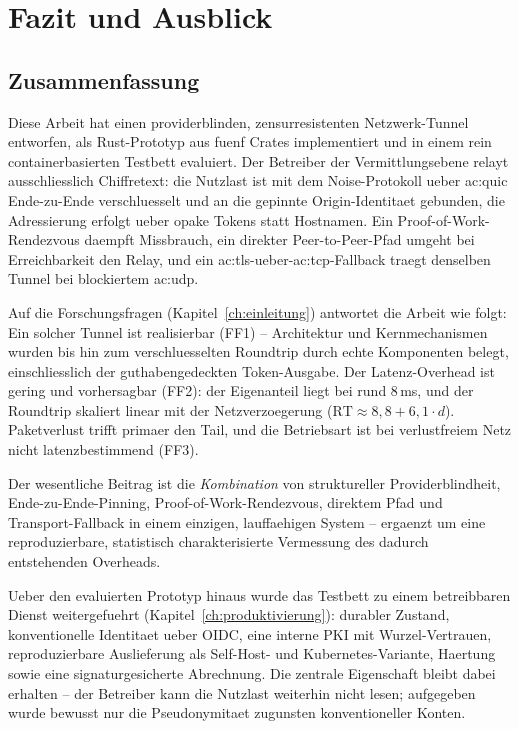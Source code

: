 \chapter{Fazit und Ausblick}
\label{ch:fazit}

\section{Zusammenfassung}
\label{sec:fazit-zusammenfassung}

Diese Arbeit hat einen providerblinden, zensurresistenten Netzwerk-Tunnel
entworfen, als Rust-Prototyp aus fuenf Crates implementiert und in einem rein
containerbasierten Testbett evaluiert. Der Betreiber der Vermittlungsebene relayt
ausschliesslich Chiffretext: die Nutzlast ist mit dem Noise-Protokoll ueber
\gls{ac:quic} Ende-zu-Ende verschluesselt und an die gepinnte Origin-Identitaet
gebunden, die Adressierung erfolgt ueber opake Tokens statt Hostnamen. Ein
Proof-of-Work-Rendezvous daempft Missbrauch, ein direkter Peer-to-Peer-Pfad
umgeht bei Erreichbarkeit den Relay, und ein
\gls{ac:tls}-ueber-\gls{ac:tcp}-Fallback traegt denselben Tunnel bei blockiertem
\gls{ac:udp}.

Auf die Forschungsfragen (Kapitel~\ref{ch:einleitung}) antwortet die Arbeit wie
folgt: Ein solcher Tunnel ist realisierbar (FF1) -- Architektur und
Kernmechanismen wurden bis hin zum verschluesselten Roundtrip durch echte
Komponenten belegt, einschliesslich der guthabengedeckten Token-Ausgabe. Der
Latenz-Overhead ist gering und vorhersagbar (FF2): der Eigenanteil liegt bei rund
8\,ms, und der Roundtrip skaliert linear mit der Netzverzoegerung
($\text{RT} \approx 8{,}8 + 6{,}1 \cdot d$). Paketverlust trifft primaer den Tail,
und die Betriebsart ist bei verlustfreiem Netz nicht latenzbestimmend (FF3).

Der wesentliche Beitrag ist die \emph{Kombination} von struktureller
Providerblindheit, Ende-zu-Ende-Pinning, Proof-of-Work-Rendezvous, direktem Pfad
und Transport-Fallback in einem einzigen, lauffaehigen System -- ergaenzt um eine
reproduzierbare, statistisch charakterisierte Vermessung des dadurch entstehenden
Overheads.

Ueber den evaluierten Prototyp hinaus wurde das Testbett zu einem betreibbaren
Dienst weitergefuehrt (Kapitel~\ref{ch:produktivierung}): durabler Zustand,
konventionelle Identitaet ueber OIDC, eine interne PKI mit
Wurzel-Vertrauen, reproduzierbare Auslieferung als Self-Host- und
Kubernetes-Variante, Haertung sowie eine signaturgesicherte Abrechnung. Die
zentrale Eigenschaft bleibt dabei erhalten -- der Betreiber kann die Nutzlast
weiterhin nicht lesen; aufgegeben wurde bewusst nur die Pseudonymitaet zugunsten
konventioneller Konten.

